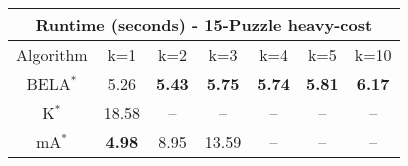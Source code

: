 \begin{tabular}{c|cccccc}\toprule
\multicolumn{7}{c}{Runtime (seconds) - 15-Puzzle heavy-cost}\\ \midrule
Algorithm & k=1 & k=2 & k=3 & k=4 & k=5 & k=10 \\ \midrule
BELA$^*$ & 5.26 & \textbf{5.43} & \textbf{5.75} & \textbf{5.74} & \textbf{5.81} & \textbf{6.17} \\
K$^*$ & 18.58 & -- & -- & -- & -- & -- \\
mA$^*$ & \textbf{4.98} & 8.95 & 13.59 & -- & -- & -- \\ \bottomrule 
\end{tabular}
